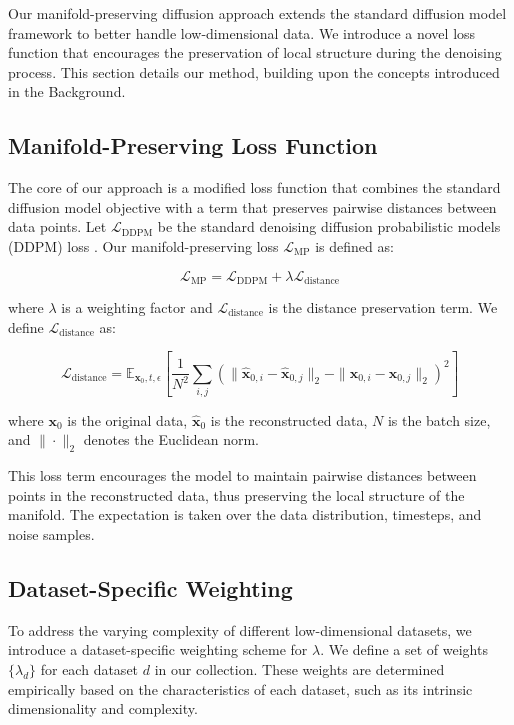 \documentclass{article} %
\begin{document}
Our manifold-preserving diffusion approach extends the standard diffusion model framework to better handle low-dimensional data. We introduce a novel loss function that encourages the preservation of local structure during the denoising process. This section details our method, building upon the concepts introduced in the Background.

\subsection{Manifold-Preserving Loss Function}

The core of our approach is a modified loss function that combines the standard diffusion model objective with a term that preserves pairwise distances between data points. Let $\mathcal{L}_\text{DDPM}$ be the standard denoising diffusion probabilistic models (DDPM) loss \cite{ddpm}. Our manifold-preserving loss $\mathcal{L}_\text{MP}$ is defined as:

\begin{equation}
\mathcal{L}_\text{MP} = \mathcal{L}_\text{DDPM} + \lambda \mathcal{L}_\text{distance}
\end{equation}

where $\lambda$ is a weighting factor and $\mathcal{L}_\text{distance}$ is the distance preservation term. We define $\mathcal{L}_\text{distance}$ as:

\begin{equation}
\mathcal{L}_\text{distance} = \mathbb{E}_{\mathbf{x}_0, t, \epsilon} \left[ \frac{1}{N^2} \sum_{i,j} {\left( \| \hat{\mathbf{x}}_{0,i} - \hat{\mathbf{x}}_{0,j} \|_2 - \| \mathbf{x}_{0,i} - \mathbf{x}_{0,j} \|_2 \right)}^2 \right]
\end{equation}

where $\mathbf{x}_0$ is the original data, $\hat{\mathbf{x}}_0$ is the reconstructed data, $N$ is the batch size, and $\| \cdot \|_2$ denotes the Euclidean norm.

This loss term encourages the model to maintain pairwise distances between points in the reconstructed data, thus preserving the local structure of the manifold. The expectation is taken over the data distribution, timesteps, and noise samples.

\subsection{Dataset-Specific Weighting}

To address the varying complexity of different low-dimensional datasets, we introduce a dataset-specific weighting scheme for $\lambda$. We define a set of weights $\{\lambda_d\}$ for each dataset $d$ in our collection. These weights are determined empirically based on the characteristics of each dataset, such as its intrinsic dimensionality and complexity.
\end{document}
